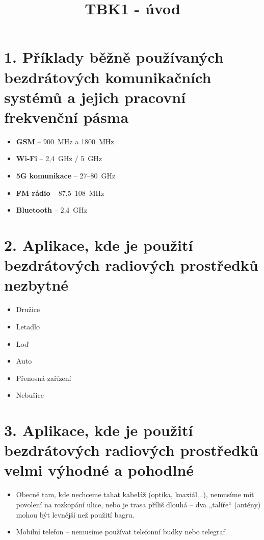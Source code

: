 \documentclass[a4paper,12pt]{article}
\title{TBK1 - úvod}
\begin{document}
\maketitle
\newpage
\section*{1. Příklady běžně používaných bezdrátových komunikačních systémů a jejich pracovní frekvenční pásma}

\begin{itemize}
    \item \textbf{GSM} – 900~MHz a 1800~MHz
    \item \textbf{Wi-Fi} – 2{,}4~GHz / 5~GHz
    \item \textbf{5G komunikace} – 27–80~GHz
    \item \textbf{FM rádio} – 87{,}5–108~MHz
    \item \textbf{Bluetooth} – 2{,}4~GHz
\end{itemize}

\section*{2. Aplikace, kde je použití bezdrátových radiových prostředků nezbytné}

\begin{itemize}
    \item Družice
    \item Letadlo
    \item Loď
    \item Auto
    \item Přenosná zařízení
    \item Nebušice
\end{itemize}

\section*{3. Aplikace, kde je použití bezdrátových radiových prostředků velmi výhodné a pohodlné}

\begin{itemize}
    \item Obecně tam, kde nechceme tahat kabeláž (optika, koaxiál...), nemusíme mít povolení na rozkopání ulice, nebo je trasa příliš dlouhá – dva „talíře“ (antény) mohou být levnější než použití bagru.
    \item Mobilní telefon – nemusíme používat telefonní budky nebo telegraf.
\end{itemize}
\end{document}
